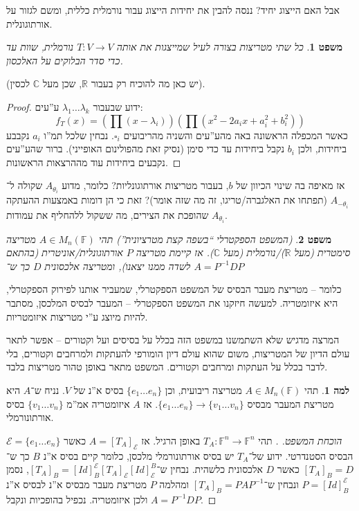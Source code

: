 \documentclass[]{article}
\newcommand\R     {\mathbb{R}}
\newcommand\C     {\mathbb{C}}
\newcommand\ec    {\mathcal{E}}
\newcommand\ta    {\theta}
\newcommand\F         {\mathbb{F}}
\newcommand\co        {\colon}
\renewcommand\lg      {\lambda}
\newcommand\op    {^{-1}}
\newcommand\cl [1]    {\left ( #1 \right )}
\newtheorem{Theorem}{משפט}
\theoremstyle{definition}
\newtheorem{Lemma}{למה}
\newcommand\theo  [1] {\begin{Theorem}#1\end{Theorem}}
\newcommand\lem   [1] {\begin{Lemma}#1\end{Lemma}}
\begin{document}
	אבל האם הייצוג יחיד? ננסה להבין את יחידות הייצוג עבור נורמלית כללית, ומשם לגזור על אורתוגונלית. 
	
	\theo{כל שתי מטריצות בצורה לעיל שמייצגות את אותה $T \co V \to V$ נורמלית, שוות עד כדי סדר הבלוקים על האלכסון. }
	
	(יש כאן מה להוכיח רק בעבור $\R$, שכן מעל $\C$ לכסין). 
	\begin{proof}
		ידוע שבעבור $\lg_1 \dots \lg_k$ ע''עים: 
		\[ f_T(x) = \cl{\prod (x - \lg_i)} \cl{\prod (x^2 - 2a_ix + a_i^2 + b_i^2)} \]
		כאשר המכפלה הראשונה באה מהע''עים והשניה מהריבועים $\square_i$. נבחין שלכל תמ''ו $a_i$ נקבבע ביחידות, ולכן $b_i$ נקבל ביחידות עד כדי סימן (נסיק זאת מהפולינום האופייני). ברור שהע''עים נקבעים ביחידות עוד מההרצאות הראשונות. 
	\end{proof}
	אז מאיפה בה שינוי הכיוון של $b$, בעבור מטריצות אורתוגונליות? כלומר, מדוע $A_{\ta_i}$ שקולה ל־$A_{-\ta_i}$ (תפתחו את האלגברה/טריגו, זה מה שזה אומר)? זאת כי הן דומות באמצעות ההעתקה שהופכת את הצירים, מה ששקול ללהחליף את עמודות $A_{\ta_i}$. 
	
	\theo{(המשפט הספקטרלי ``בשפה קצת מטרציונית'') תהי $A \in M_n(\F)$ מטריצה סימטרית (מעל $\R$)/נורמלית (מעל $\C$). אז קיימת  מטריצה $P$ אורתוגונלית/אוניטרית (בהתאם לשדה ממנו יצאנו), ומטריצה אלכסונית $D$ כך ש־
	$ A = P\op D P $}
	כלומר – מטריצת מעבר הבסיס של המשפט הספקטרלי, שמעביר אותנו לפירוק הספקטרלי, היא איזומטריה. למעשה חיזקנו את המשפט הספקטרלי – המעבר לבסיס המלכסן, מסתבר להיות מיוצג ע''י מטריצות איזומטריות. 
	
	המרצה מדגיש שלא השתמשנו במשפט הזה בכלל על בסיסים ועל וקטורים – אפשר לתאר עולם הדיון של המטריצות, משום שהוא עולם דיון הומורפי להעתקות ולמרחבים וקטורים, בלי לדבר בכלל על העתקות ומרחבים וקטורים. המשפט מתאר באופן טהור מטריצות בלבד. 
	
	\lem{תהי $A \in M_n(\F)$ מטריצה ריבועית, וכן $\{e_1 \dots e_n\}$ בסיס א''נ של $V$. נניח ש־$A$ היא מטריצת המעבר מבסיס $\{e_1 \dots e_n\} \to \{v_1 \dots v_n\}$. אז $A$ איזומטריה אמ''מ $\{v_1 \dots v_n\}$ בסיס אורתונורמלי. }
	\begin{proof}[הוכחת המשפט. ]
		תהי $T_A \co \F^n \to \F^n$ באופן הרגיל. אז $A= [T_A]_\ec$ כאשר $\ec = \{e_1 \dots e_n\}$ הבסיס הסטנדרטי. ידוע של־$T_A$ יש בסיס אורתונורמלי מלכסן, כלומר קיים בסיס א''נ $B$ כך ש־$[T_A]_B = D$ כאשר $D$ אלכסונית כלשהית. נבחין ש־$[T_A]_B = [Id]^\ec_B [T_A]_\ec [Id]_\ec^B$, נסמן $P = [Id]^\ec_B$ ונבחין ש־$[T_A]_B = PAP\op$ ומהלמה $P$ מטריצת מעבר מבסיס א''נ לבסיס א''נ ולכן איזומטריה. נכפיל בהופכיות ונקבל $A = P\op DP$. 
	\end{proof}
	
\end{document}
